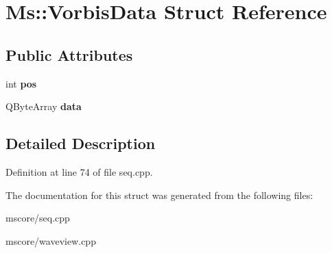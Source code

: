 \hypertarget{struct_ms_1_1_vorbis_data}{}\section{Ms\+:\+:Vorbis\+Data Struct Reference}
\label{struct_ms_1_1_vorbis_data}
\subsection*{Public Attributes}
\begin{DoxyCompactItemize}
\item 
\mbox{\label{struct_ms_1_1_vorbis_data_a6c9b7d000a7805775e44d7148ffa7e43}} 
int {\bfseries pos}
\item 
\mbox{\label{struct_ms_1_1_vorbis_data_a60ea22ac79306b97d39ecc8bc335af86}} 
Q\+Byte\+Array {\bfseries data}
\end{DoxyCompactItemize}


\subsection{Detailed Description}


Definition at line 74 of file seq.\+cpp.



The documentation for this struct was generated from the following files\+:\begin{DoxyCompactItemize}
\item 
mscore/seq.\+cpp\item 
mscore/waveview.\+cpp\end{DoxyCompactItemize}
